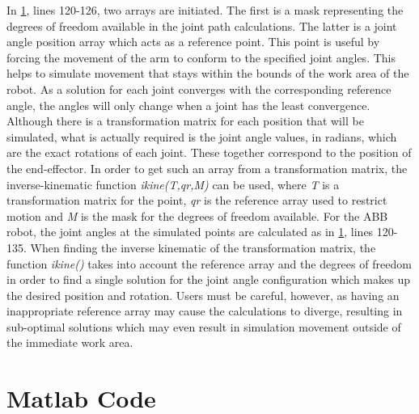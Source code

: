 \documentclass[11pt,a4paper, margin=1in]{report}
\begin{document}
In \cref{Matlab}, lines 120-126, two arrays are initiated. The first is a mask representing the degrees of freedom available in the joint path calculations. The latter is a joint angle position array which acts as a reference point. This point is useful by forcing the movement of the arm to conform to the specified joint angles. This helps to simulate movement that stays within the bounds of the work area of the robot. As a solution for each joint converges with the corresponding reference angle, the angles will only change when a joint has the least convergence.\\
Although there is a transformation matrix for each position that will be simulated, what is actually required is the joint angle values, in radians, which are the exact rotations of each joint. These together correspond to the position of the end-effector. In order to get such an array from a transformation matrix, the inverse-kinematic function \textit{ikine(T,qr,M)} can be used, where \textit{T} is a transformation matrix for the point, \textit{qr} is the reference array used to restrict motion and\textit{ M} is the mask for the degrees of freedom available. For the ABB robot, the joint angles at the simulated points are calculated as in \cref{Matlab}, lines 120-135. When finding the inverse kinematic of the transformation matrix, the function \textit{ikine()} takes into account the reference array and the degrees of freedom in order to find a single solution for the joint angle configuration which makes up the desired position and rotation. Users must be careful, however, as having an inappropriate reference array may cause the calculations to diverge, resulting in sub-optimal solutions which may even result in simulation movement outside of the immediate work area.\\ 
 

\appendix
\chapter{Matlab Code}
\label{Matlab}
\end{document}
